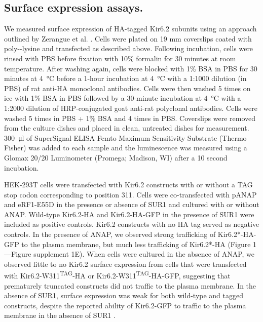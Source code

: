 \documentclass[9pt,lineno, onehalfspacing]{elife_modified}
\begin{document}
\subsection{Surface expression assays.}
We measured surface expression of HA-tagged Kir6.2 subunits using an approach outlined by Zerangue et al. \citep{RN38, RN80}.
Cells were plated on 19 mm coverslips coated with poly--lysine and transfected as described above.
Following incubation, cells were rinsed with PBS before fixation with 10\% formalin for 30 minutes at room temperature.
After washing again, cells were blocked with 1\% BSA in PBS for 30 minutes at \SI{4}{\degreeCelsius} before a 1-hour incubation at \SI{4}{\degreeCelsius} with a 1:1000 dilution (in PBS) of rat anti-HA monoclonal antibodies.
Cells were then washed 5 times on ice with 1\% BSA in PBS followed by a 30-minute incubation at \SI{4}{\degreeCelsius} with a 1:2000 dilution of HRP-conjugated goat anti-rat polyclonal antibodies.
Cells were washed 5 times in PBS + 1\% BSA and 4 times in PBS.
Coverslips were removed from the culture dishes and placed in clean, untreated dishes for measurement.
\SI{300}{\micro\litre} of SuperSignal ELISA Femto Maximum Sensitivity Substrate (Thermo Fisher) was added to each sample and the luminescence was measured using a Glomax 20/20 Luminometer (Promega; Madison, WI) after a 10 second incubation.

HEK-293T cells were transfected with Kir6.2 constructs with or without a TAG stop codon corresponding to position 311.
Cells were co-transfected with pANAP and eRF1-E55D in the presence or absence of SUR1 and cultured with or without ANAP.
Wild-type Kir6.2-HA and Kir6.2-HA-GFP in the presence of SUR1 were included as positive controls.
Kir6.2 constructs with no HA tag served as negative controls.
In the presence of ANAP, we observed strong trafficking of Kir6.2*-HA-GFP to the plasma membrane, but much less trafficking of Kir6.2*-HA (Figure 1—Figure supplement 1E).
When cells were cultured in the absence of ANAP, we observed little to no Kir6.2 surface expression from cells that were transfected with Kir6.2-W311\textsuperscript{TAG}-HA or Kir6.2-W311\textsuperscript{TAG}-HA-GFP, suggesting that prematurely truncated constructs did not traffic to the plasma membrane.
In the absence of SUR1, surface expression was weak for both wild-type and tagged constructs, despite the reported ability of Kir6.2-GFP to traffic to the plasma membrane in the absence of SUR1 \citep{RN86, RN48}.
\end{document}
